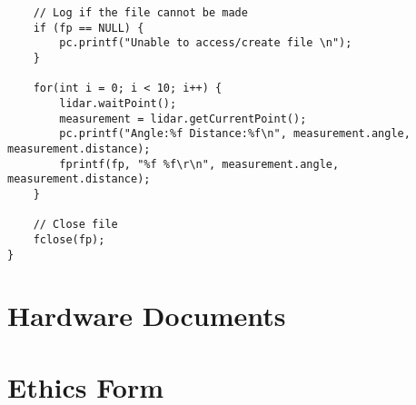 \begin{appendices}
\begin{lstlisting}
	// Log if the file cannot be made
	if (fp == NULL) {
		pc.printf("Unable to access/create file \n");
	}

	for(int i = 0; i < 10; i++) {
		lidar.waitPoint();
		measurement = lidar.getCurrentPoint();
		pc.printf("Angle:%f Distance:%f\n", measurement.angle, measurement.distance);
		fprintf(fp, "%f %f\r\n", measurement.angle, measurement.distance);
	}
					
	// Close file
	fclose(fp);
}
			\end{lstlisting}
	
	\chapter{Hardware Documents}
	
	\chapter{Ethics Form}
	
	\end{appendices}
			
